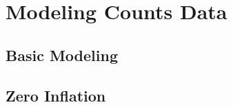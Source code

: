 \documentclass[a4paper,12pt]{article}
\begin{document}
\section{Modeling Counts Data}
\label{sec:modeling-counts-data}

\subsection{Basic Modeling}
\label{sec:basic-modeling}

\subsection{Zero Inflation}
\label{sec:zero-inflation}





\end{document}
